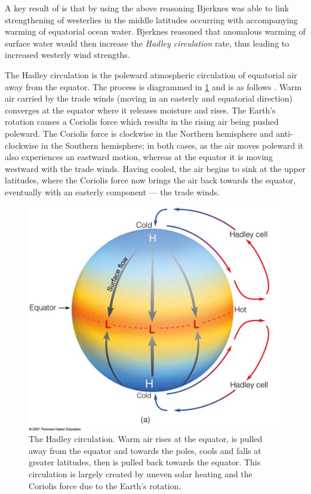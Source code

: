 A key result of \citep{bjerknes1966} is that by using the above reasoning
Bjerknes was able to link strengthening of westerlies in the middle latitudes
occurring with accompanying warming of equatorial ocean water. Bjerknes reasoned
that anomalous warming of surface water would then increase the \emph{Hadley
  circulation} rate, thus leading to increased westerly wind strengths.

The Hadley circulation is the poleward atmospheric circulation of
equatorial air away from the equator. The process is diagrammed in
\ref{fig:hadleycell} and is as follows \citep{geomar6557}. Warm air carried by
the trade winds (moving in an easterly and equatorial direction) converges at
the equator where it releases moisture and rises. The Earth's rotation causes a
Coriolis force which results in the rising air being pushed poleward. The
Coriolis force is clockwise in the Northern hemisphere and anti-clockwise in the
Southern hemisphere; in both cases, as the air moves poleward it also
experiences an eastward motion, whereas at the equator it is moving westward
with the trade winds. Having cooled, the air begins to sink at the upper
latitudes, where the Coriolis force now brings the air back towards the equator,
eventually with an easterly component --- the trade winds.

\begin{figure}[t]
  \centering \includegraphics[width=0.9\linewidth]{figures/hadleycell.png}
  \caption{The Hadley circulation. Warm air rises at the equator, is pulled away
    from the equator and towards the poles, cools and falls at greater
    latitudes, then is pulled back towards the equator. This circulation is
    largely created by uneven solar heating and the Coriolis force due to the
    Earth's rotation.}
  \label{fig:hadleycell}
\end{figure}

